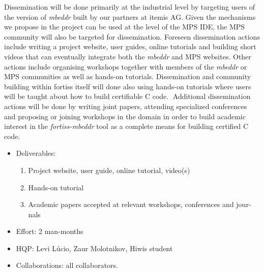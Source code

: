 Dissemination will be done primarily at the industrial level by targeting users
of the version of \emph{mbeddr} built by our partners at itemis AG. Given the
mechanisms we propose in the project can be used at the level of the MPS IDE,
the MPS community will also be targeted for dissemination. Foreseen
dissemination actions include writing a project website, user guides, online
tutorials and building short videos that can eventually integrate both the \emph{mbeddr} and MPS
websites. Other actions include organising workshops together with members of
the \emph{mbeddr} or MPS communities as well as hands-on tutorials.
Dissemination and community building within fortiss itself will done also using
hands-on tutorials where users will be taught about how to build certifiable C
code.􏰁 Additional dissemination actions will be done by writing joint papers,
attending specialized conferences and proposing or joining workshops in the
domain in order to build academic interest in the \emph{fortiss-mbeddr} tool as
a complete means for building certified C code.

\begin{itemize}
  \item Deliverables:
  \begin{enumerate}
    \item Project website, user guide, online tutorial, video(s)
	\item Hands-on tutorial
	\item Academic papers accepted at relevant workshops, conferences and jour-
nals
  \end{enumerate}
  \item Effort: 2 man-months
  \item HQP: Levi L\'ucio, Zaur Molotnikov, Hiwis student
  \item Collaborations: all collaborators.
\end{itemize}